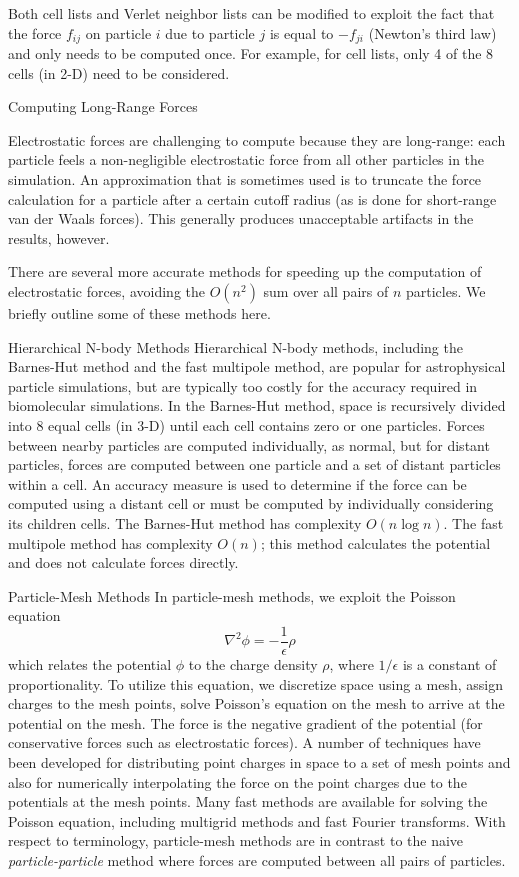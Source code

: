 Both cell lists and Verlet neighbor lists can be modified to exploit the fact
that the force $f_{ij}$ on particle $i$ due to particle $j$ is
equal to $-f_{ji}$ (Newton's third law) and only needs to be
computed once.  For example, for cell lists,
only 4 of the 8 cells (in 2-D) need to be considered.

 {Computing Long-Range Forces}

Electrostatic forces are challenging to compute because they are
long-range:  each particle feels a non-negligible electrostatic force
from all other particles in the simulation.  An approximation that is
sometimes used is to truncate the force calculation for a particle after
a certain cutoff radius (as is done for short-range van der Waals forces).
This generally produces unacceptable artifacts in the results, however.

There are several more accurate methods for speeding up
the computation of electrostatic forces, avoiding the $O(n^2)$
sum over all pairs of $n$ particles.  We briefly outline some of these
methods here.

 {Hierarchical N-body Methods}  
Hierarchical N-body methods, including
the Barnes-Hut method and the fast multipole method, are popular for
astrophysical particle simulations, but are typically too costly for the
accuracy required in biomolecular simulations.  In the Barnes-Hut method,
space is recursively divided into 8 equal cells (in 3-D) until each
cell contains zero or one particles.  Forces between nearby particles
are computed individually, as normal, but for distant particles, forces
are computed between one particle and a set of distant particles within
a cell.  An accuracy measure is used to determine if the force can
be computed using a distant cell or must be computed by individually
considering its children cells.  The Barnes-Hut method has complexity
$O(n \log n)$.  The fast multipole method has complexity
$O(n)$; this method calculates the potential and does not calculate forces directly.

 {Particle-Mesh Methods}  
In particle-mesh methods, we exploit
the Poisson equation
\[
 \nabla^2 \phi = -\frac{1}{\epsilon} \rho
\]
which relates the potential $\phi$ to the charge density $\rho$, where
$1/\epsilon$ is a constant of proportionality.  To utilize this equation, we
discretize space using a mesh, assign charges to the mesh points, solve
Poisson's equation on the mesh to arrive at the potential on the mesh.
The force is the negative gradient of the potential (for conservative
forces such as electrostatic forces).  A number of techniques have been
developed for distributing point charges in space to a set of mesh points
and also for numerically interpolating the force on the
point charges due to the potentials at the mesh points.  Many fast methods
are available for solving the Poisson equation, including multigrid
methods and fast Fourier transforms.  With respect
to terminology, particle-mesh methods are in contrast to the naive {\em
particle-particle} method where forces are computed between all pairs
of particles.

